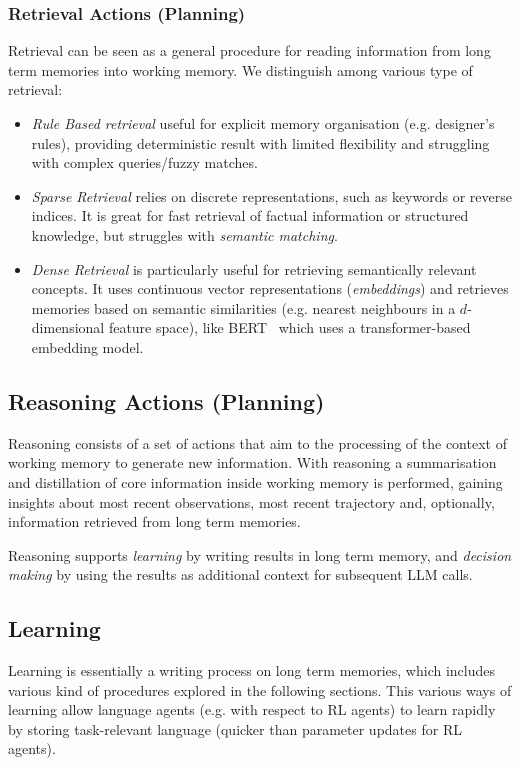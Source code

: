 \subsubsection{Retrieval Actions (Planning)}
Retrieval can be seen as a general procedure for reading information from long
term memories into working memory. We distinguish among various type of
retrieval:
\begin{itemize}
    \item \emph{Rule Based retrieval} useful for explicit memory organisation
        (e.g. designer's rules), providing deterministic result with limited
        flexibility and struggling with complex queries/fuzzy matches.
    \item \emph{Sparse Retrieval} relies on discrete representations, such as
        keywords or reverse indices. It is great for fast retrieval of factual
        information or structured knowledge, but struggles with \emph{semantic
        matching}.
    \item \emph{Dense Retrieval} is particularly useful for retrieving
        semantically relevant concepts. It uses continuous vector
        representations (\emph{embeddings}) and retrieves memories based on
        semantic similarities (e.g. nearest neighbours in a $d$-dimensional
        feature space), like
        BERT~\cite{devlin2019bertpretrainingdeepbidirectional} which uses a
        transformer-based embedding model.
\end{itemize}

\subsection{Reasoning Actions (Planning)}
Reasoning consists of a set of actions that aim to the processing of the
context of working memory to generate new information. With reasoning a
summarisation and distillation of core information inside working memory is
performed, gaining insights about most recent observations, most recent
trajectory and, optionally, information retrieved from long term memories.

Reasoning supports \emph{learning} by writing results in long term memory, and
\emph{decision making} by using the results as additional context for
subsequent \ac{LLM} calls.

\subsection{Learning}\label{ssec:learning}
Learning is essentially a writing process on long term memories, which includes
various kind of procedures explored in the following sections. This various
ways of learning allow language agents (e.g. with respect to \ac{RL} agents) to
learn rapidly by storing task-relevant language (quicker than parameter updates
for \ac{RL} agents).

